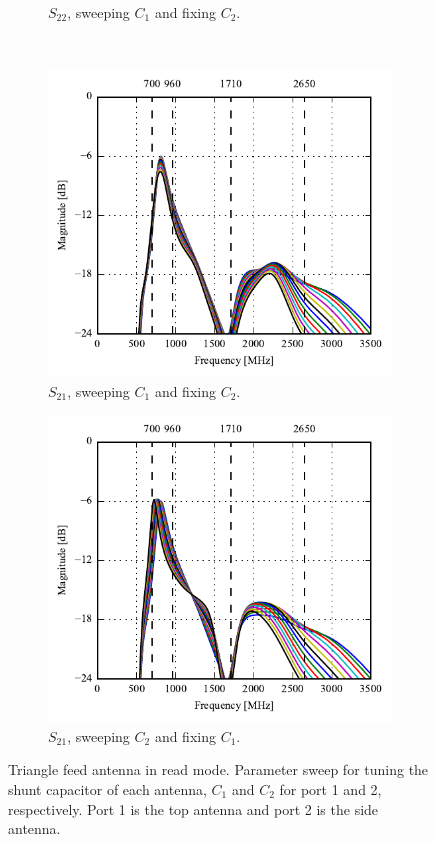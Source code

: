 \begin{figure}[htbp]
\begin{subfigure}[b]{0.49\linewidth}
        \caption{$S_{22}$, sweeping $C_1$ and fixing $C_2$.}
    \end{subfigure}
    \\
    \begin{subfigure}[b]{0.49\linewidth}
        \centering
        \includegraphics{img/tech_sol/trianglefeed/read_mode/Csh1s21.pdf}
        \caption{$S_{21}$, sweeping $C_1$ and fixing $C_2$.}
    \end{subfigure}
    \hfill
    \begin{subfigure}[b]{0.49\linewidth}
        \centering
        \includegraphics{img/tech_sol/trianglefeed/read_mode/Csh2s21.pdf}
        \caption{$S_{21}$, sweeping $C_2$ and fixing $C_1$.}
    \end{subfigure}
    \caption{Triangle feed antenna in read mode. Parameter sweep for tuning the shunt capacitor of each antenna, $C_1$ and $C_2$ for port 1 and 2, respectively. Port 1 is the top antenna and port 2 is the side antenna.}
    \label{fig:tiang_sparam_sweep_read}
\end{figure}


